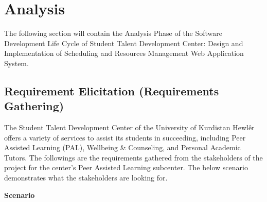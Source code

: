 \section{Analysis}
\begin{justify}
    The following section will contain the Analysis Phase of the Software Development Life Cycle of Student Talent Development Center: Design and Implementation of Scheduling and Resources Management Web Application System.\\
\end{justify}


\subsection{Requirement Elicitation (Requirements Gathering)}
\begin{justify}
    The Student Talent Development Center of the University of Kurdistan Hewlêr offers a variety of services to assist its students in succeeding, including Peer Assisted Learning (PAL), Wellbeing \& Counseling, and Personal Academic Tutors. The followings are the requirements gathered from the stakeholders of the project for the center's Peer Assisted Learning subcenter. The below scenario demonstrates what the stakeholders are looking for.

    \vspace{0.25cm}
    \newendline \textbf{Scenario}


\end{justify}
